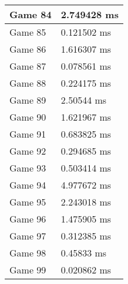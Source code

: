 \begin{tabular}{|l|l|}
	Game 84 & 2.749428 ms \\ \hline
	Game 85 & 0.121502 ms \\ \hline
	Game 86 & 1.616307 ms \\ \hline
	Game 87 & 0.078561 ms \\ \hline
	Game 88 & 0.224175 ms \\ \hline
	Game 89 & 2.50544 ms \\ \hline
	Game 90 & 1.621967 ms \\ \hline
	Game 91 & 0.683825 ms \\ \hline
	Game 92 & 0.294685 ms \\ \hline
	Game 93 & 0.503414 ms \\ \hline
	Game 94 & 4.977672 ms \\ \hline
	Game 95 & 2.243018 ms \\ \hline
	Game 96 & 1.475905 ms \\ \hline
	Game 97 & 0.312385 ms \\ \hline
	Game 98 & 0.45833 ms \\ \hline
	Game 99 & 0.020862 ms \\ \hline
\end{tabular}
